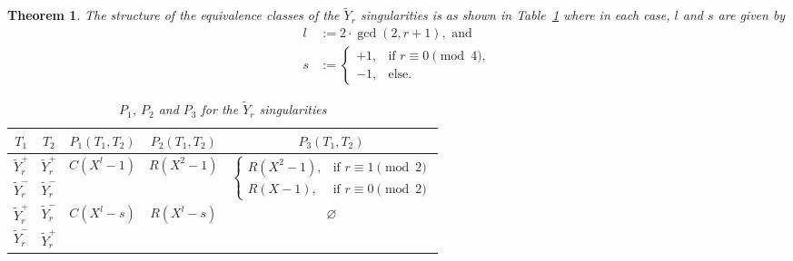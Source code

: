 \documentclass[noend]{amsproc}
\newtheorem{theorem}{Theorem}
\theoremstyle{definition}
\newcommand{\tY}{\widetilde{Y}}
\begin{document}
\begin{theorem}
The structure of the equivalence classes of the $\tY_r$ singularities is as
shown in Table~\ref{tab:tYr_equivalences} where in each case, $l$ and $s$ are
given by
\begin{align*}
l &:= 2\cdot{\gcd(2, r+1)}, \text{ and} \\
s &:=
\begin{cases}
  +1, &\text{if } r \equiv 0 \pmod{4}, \\
  -1, &\text{else.}
\end{cases}
\end{align*}

\begin{table}[htbp]
\centering
\caption{$P_1$, $P_2$ and $P_3$ for the $\tY_r$ singularities}
\label{tab:tYr_equivalences}
\begin{tabular}{|c|c||c|c|c|}
\hline

$T_1$ & $T_2$ & $P_1(T_1, T_2)$ & $P_2(T_1, T_2)$ & $P_3(T_1, T_2)$ \\
\hline\hline

$\tY_r^+$ & $\tY_r^+$ &
\multirow{2}{*}{$C(X^l-1)$} &
\multirow{2}{*}{$R(X^2-1)$} &
\multirow{2}{*}{$\begin{cases}
  R(X^2-1), &\text{if } r \equiv 1 \pmod{2} \\
  R(X-1),   &\text{if } r \equiv 0 \pmod{2}
\end{cases}$} \\
\cline{1-2}

$\tY_r^-$ & $\tY_r^-$ &
&
&
\\
\hline

$\tY_r^+$ & $\tY_r^-$ &
\multirow{2}{*}{$C(X^l-s)$} &
\multirow{2}{*}{$R(X^l-s)$} &
\multirow{2}{*}{$\varnothing$} \\
\cline{1-2}

$\tY_r^-$ & $\tY_r^+$ &
&
&
\\
\hline

\end{tabular}
\end{table}

\end{theorem}
\end{document}
